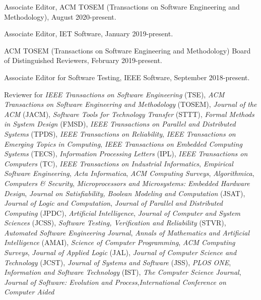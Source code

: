 \documentclass[ComputerScience]{vita}
\begin{document}
\begin{vita}
\begin{Professional Activities and Service}
  \item Associate Editor, ACM TOSEM (Transactions on Software Engineering and
    Methodology), 
    August 2020-present.
  
  \item Associate Editor, IET Software, 
    January 2019-present.

  \item ACM TOSEM (Transactions on Software Engineering and
    Methodology) Board of Distinguished Reviewers, February 2019-present.
  
  \item Associate Editor for Software Testing, IEEE Software,
    September 2018-present.

  \item Reviewer for \emph{IEEE Transactions on Software Engineering} (TSE), \emph{ACM
   Transactions
   on  Software  Engineering  and  Methodology} (TOSEM), \emph{Journal of the ACM} (JACM), 
  \emph{Software Tools for Technology Transfer} (STTT), \emph{Formal
    Methods in System Design} (FMSD), \emph{IEEE Transactions on
    Parallel and Distributed Systems} (TPDS), \emph{IEEE Transactions
    on Reliability}, \emph{IEEE Transactions on Emerging Topics in Computing}, \emph{IEEE Transactions on Embedded Computing
    Systems} (TECS), \emph{Information Processing Letters} (IPL),
  \emph{IEEE Transactions on Computers} (TC), \emph{IEEE Transactions
    on Industrial Informatics}, \emph{Empirical Software Engineering},
  \emph{Acta Informatica}, \emph{ACM Computing Surveys},
  \emph{Algorithmica}, \emph{Computers \& Security},
  \emph{Microprocessors and Microsystems: Embedded Hardware Design},
  \emph{Journal on Satisfiability, Boolean Modeling and Computation}
  (JSAT), \emph{Journal of Logic and Computation}, \emph{Journal of
    Parallel and Distributed Computing} (JPDC), \emph{Artificial
    Intelligence}, \emph{Journal of Computer and System Sciences}
  (JCSS), \emph{Software Testing, Verification and Reliability}
  (STVR), \emph{Automated Software Engineering Journal}, \emph{Annals
    of Mathematics and Artificial Intelligence} (AMAI), \emph{Science
    of Computer Programming}, \emph{ACM Computing Surveys}, \emph{Journal of Applied Logic} (JAL),
  \emph{Journal of Computer Science and Technology} (JCST),
  \emph{Journal of Systems and Software} (JSS), \emph{PLOS ONE},
  \emph{Information and Software Technology} (IST), \emph{The Computer
    Science Journal}, \emph{Journal of Software: Evolution and Process},\emph{International Conference on Computer Aided
}
\end{Professional Activities and Service}
\end{vita}
\end{document}
